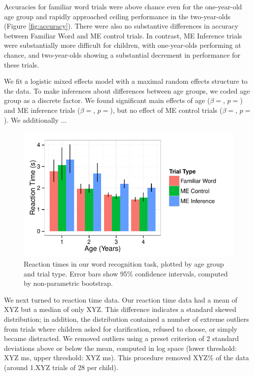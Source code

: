 \documentclass[man,noapacite]{apa2}
\begin{document}
Accuracies for familiar word trials were above chance even for the one-year-old age group and rapidly approached ceiling performance in the two-year-olds (Figure \ref{fig:accuracy}). There were also no substantive differences in accuracy between Familiar Word and ME control trials. In contrast, ME Inference trials were substantially more difficult for children, with one-year-olds performing at chance, and two-year-olds showing a substantial decrement in performance for these trials. 

We fit a logistic mixed effects model with a maximal random effects structure \cite{barr2013} to the data. To make inferences about differences between age groups, we coded age group as a discrete factor.  We found significant main effects of age ($\beta = $, $p = $) and ME inference trials ($\beta = $, $p = $), but no effect of ME control trials ($\beta = $, $p = $). We additionally ...


\begin{figure}[t] 
  \begin{center} 
    \includegraphics[width=5in]{figures/rt.pdf} 
    \caption{\label{fig:rt} Reaction times in our word recognition task, plotted by age group and trial type. Error bars show 95\% confidence intervals, computed by non-parametric bootstrap.}
  \end{center} 
\end{figure}

We next turned to reaction time data. Our reaction time data had a mean of XYZ but a median of only XYZ. This difference indicates a standard skewed distribution; in addition, the distribution contained a number of extreme outliers from trials where children asked for clarification, refused to choose, or simply became distracted. We removed outliers using a preset criterion of 2 standard deviations above or below the mean, computed in log space (lower threshold: XYZ ms, upper threshold: XYZ ms). This procedure removed XYZ\% of the data (around 1.XYZ trials of 28 per child). 
\end{document}
